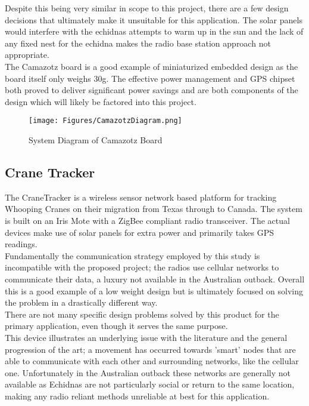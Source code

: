 \documentclass[12pt,openany,a4paper]{book}
\begin{document}
			Despite this being very similar in scope to this project, there are a few design decisions that ultimately make it unsuitable for this application. The solar panels would interfere with the echidnas attempts to warm up in the sun and the lack of any fixed nest for the echidna makes the radio base station approach not appropriate. \\
			
			The Camazotz board is a good example of miniaturized embedded design as the board itself only weighs 30g. The effective power management and GPS chipset both proved to deliver significant power savings and are both components of the design which will likely be factored into this project. 
			\begin{figure}[H]
				\centering
				\texttt{[image: Figures/CamazotzDiagram.png]}
				\caption{System Diagram of Camazotz Board}
				\label{fig:Camazotz}
			\end{figure}		
		\subsection{Crane Tracker}
			The CraneTracker \cite{Bennett11} is a wireless sensor network based platform for tracking Whooping Cranes on their migration from Texas through to Canada. The system is built on an Iris Mote with a ZigBee compliant radio transceiver. The actual devices make use of solar panels for extra power and primarily takes GPS readings.\\
			
			 Fundamentally the communication strategy employed by this study is incompatible with the proposed project; the radios use cellular networks to communicate their data, a luxury not available in the Australian outback. Overall this is a good example of a low weight design but is ultimately focused on solving the problem in a drastically different way. \\
			 
			 There are not many specific design problems solved by this product for the primary application, even though it serves the same purpose. \\ 
			 
			 This device illustrates an underlying issue with the literature and the general progression of the art; a movement has occurred towards 'smart' nodes that are able to communicate with each other and surrounding networks, like the cellular one. Unfortunately in the Australian outback these networks are generally not available as Echidnas are not particularly social or return to the same location, making any radio reliant methods unreliable at best for this application.
			 
\end{document}
